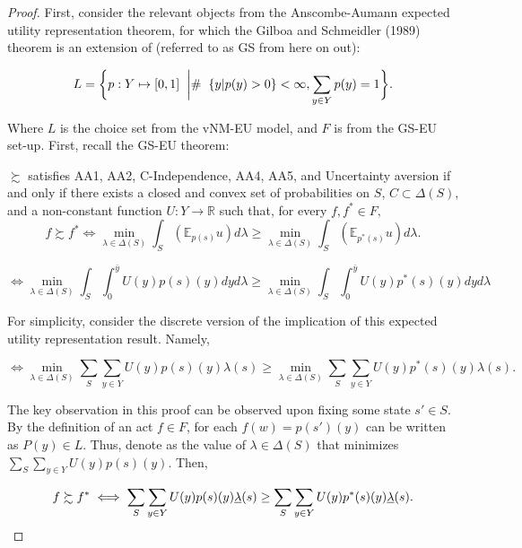 \documentclass[\econtexRoot/IneqMeas]{subfiles}
\begin{document}
\begin{proof}

	\par First, consider the relevant objects from the Anscombe-Aumann expected utility representation theorem, for which the Gilboa and Schmeidler (1989) theorem is an extension of (referred to as GS from here on out):
	
	$$ L = \bigg\{ p: Y \mapsto [0,1] \hspace{2mm} \bigg| \# \hspace{2mm} \{y|p(y)>0\} < \infty, \sum_{y \in Y} p(y) =1  \bigg\}. $$


	\par Where $L$ is the choice set from the vNM-EU model, and $F$ is from the GS-EU set-up. First, recall the GS-EU theorem:

\begin{tm}
$\succsim $ satisfies AA1, AA2, C-Independence, AA4, AA5, and Uncertainty aversion if and only if there exists a closed and convex set of probabilities on $S$, $C \subset \Delta(S)$, and a non-constant function $U: Y \to \mathbb{R}$ such that, for every $f, f^* \in F,$
$$ f \succsim f^* \iff \min_{\lambda \in \Delta(S)} \int_{S} (\mathbb{E}_{p(s)} u) d \lambda  \geq \min_{\lambda \in \Delta(S)} \int_{S} (\mathbb{E}_{p^{*}(s)} u) d \lambda.$$
\end{tm}

$$	\iff  \min_{\lambda \in \Delta(S)} \int_{S} \int_{0}^{\bar{y}} U(y)p(s)(y) dy d \lambda \geq  \min_{\lambda \in \Delta(S)} \int_{S} \int_{0}^{\bar{y}} U(y)p^{*}(s)(y) dy  d \lambda $$

	\par For simplicity, consider the discrete version of the implication of this expected utility representation result. Namely,

$$  \iff  \min_{\lambda \in \Delta(S)} \sum_{S} \sum_{y \in Y} U(y)p(s)(y) \lambda(s) \geq  \min_{\lambda \in \Delta(S)} \sum_{S} \sum_{y \in Y} U(y)p^{*}(s)(y) \lambda(s).   $$

	\par The key observation in this proof can be observed upon fixing some state $s' \in S$. By the definition of an act $f \in F$, for each $f(w)=p(s')(y)$ can be written as $P(y) \in L$. Thus, denote \underbar{$\lambda$} as the value of $\lambda \in \Delta(S)$ that minimizes  $\sum_{S} \sum_{y \in Y} U(y)p(s)(y)$. Then,
	
$$  f \succsim f^* \iff  \sum_{S} \sum_{y \in Y} U(y)p(s)(y) \underbar{$\lambda$}(s) \geq  \sum_{S} \sum_{y \in Y} U(y)p^{*}(s)(y) \underbar{$\lambda$}(s).   $$


\end{proof}
\end{document}
